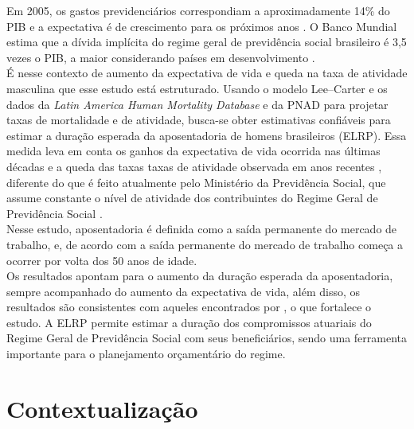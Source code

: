 \documentclass[12pt, 						%
			openright, 					%
			twoside,					%
			a4paper,x					%
			english,					%
			brazil]{abntex2}				%
\begin{document}
	Em 2005, os gastos previdenciários correspondiam a aproximadamente 14\% do PIB e a expectativa é de crescimento para os próximos anos \cite{brasil2003gasto, giambiagi1997despesa, queiroz_figoli}. O Banco Mundial estima que a dívida implícita do regime geral de previdência social brasileiro é 3,5 vezes o PIB, a maior considerando países em desenvolvimento \cite{holzmann2004implicit}. \\
	É nesse contexto de aumento da expectativa de vida e queda na taxa de atividade masculina que esse estudo está estruturado. Usando o modelo Lee--Carter e os dados da \textit{Latin America Human Mortality Database} e da PNAD para projetar taxas de mortalidade e de atividade, busca-se obter estimativas confiáveis para estimar a duração esperada da aposentadoria de homens brasileiros (ELRP). Essa medida leva em conta os ganhos da expectativa de vida ocorrida nas últimas décadas e a queda das taxas taxas de atividade observada em anos recentes \cite{queiroz2007determinants}, diferente do que é feito atualmente pelo Ministério da Previdência Social, que assume constante o nível de atividade dos contribuintes do Regime Geral de Previdência Social \cite{projeccao}. \\
	Nesse estudo, aposentadoria é definida como a saída permanente do mercado de trabalho, e, de acordo com  a saída permanente do mercado de trabalho começa a ocorrer por volta dos 50 anos de idade. \\
	Os resultados apontam para o aumento da duração esperada da aposentadoria, sempre acompanhado do aumento da expectativa de vida, além disso, os resultados são consistentes com aqueles encontrados por , o que fortalece o estudo. A ELRP permite estimar a duração dos compromissos atuariais do Regime Geral de Previdência Social com seus beneficiários, sendo uma ferramenta importante para o planejamento orçamentário do regime.


\chapter{Contextualização \label{cap2}}
\end{document}
